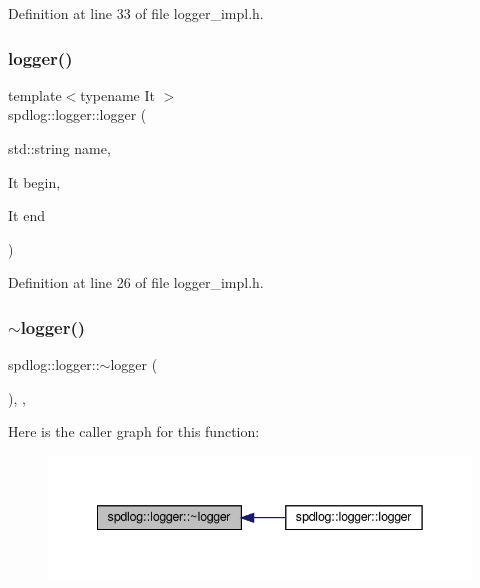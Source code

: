 Definition at line 33 of file logger\+\_\+impl.\+h.

\mbox{\label{classspdlog_1_1logger_a414da79baaad89ba6ffe0e738027d234}} 
\subsubsection{\texorpdfstring{logger()}{logger()}\hspace{0.1cm}{\footnotesize\ttfamily [3/4]}}
{\footnotesize\ttfamily template$<$typename It $>$ \\
spdlog\+::logger\+::logger (\begin{DoxyParamCaption}\item[{std\+::string}]{name,  }\item[{It}]{begin,  }\item[{It}]{end }\end{DoxyParamCaption})\hspace{0.3cm}{\ttfamily [inline]}}



Definition at line 26 of file logger\+\_\+impl.\+h.

\mbox{\label{classspdlog_1_1logger_a3691352a0a61bcba0bf3fb32d236bce5}} 
\subsubsection{\texorpdfstring{$\sim$logger()}{~logger()}}
{\footnotesize\ttfamily spdlog\+::logger\+::$\sim$logger (\begin{DoxyParamCaption}{ }\end{DoxyParamCaption})\hspace{0.3cm}{\ttfamily [inline]}, {\ttfamily [virtual]}, {\ttfamily [default]}}

Here is the caller graph for this function\+:
\nopagebreak
\begin{figure}[H]
\begin{center}
\leavevmode
\includegraphics[width=342pt]{classspdlog_1_1logger_a3691352a0a61bcba0bf3fb32d236bce5_icgraph}
\end{center}
\end{figure}
\mbox{\label{classspdlog_1_1logger_aa6074d763b0df4e7d16ccf7d307a3938}} 

